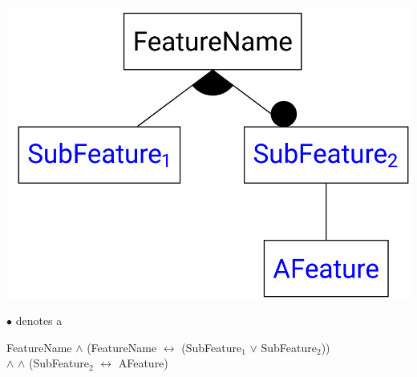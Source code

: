 \documentclass[
    ../../Software_Engineering_Summary.tex,
]
{subfiles}
\begin{document}
\begin{minipage}
    [c]{0.35\textwidth}
    \centering
    \includegraphics[width = \textwidth]{Pics/12/FeatureDiagramMandatory.png}
\end{minipage}
\begin{minipage}
    [c]{0.65\textwidth}
    $\bullet$ denotes a 

    \begin{defbox}
        FeatureName $\land$ (FeatureName $\leftrightarrow$ (SubFeature$_1$ $\lor$ SubFeature$_2$))\\ $\land$  $\land$ (SubFeature$_2$ $\leftrightarrow$ AFeature)
    \end{defbox}
\end{minipage}
\end{document}
